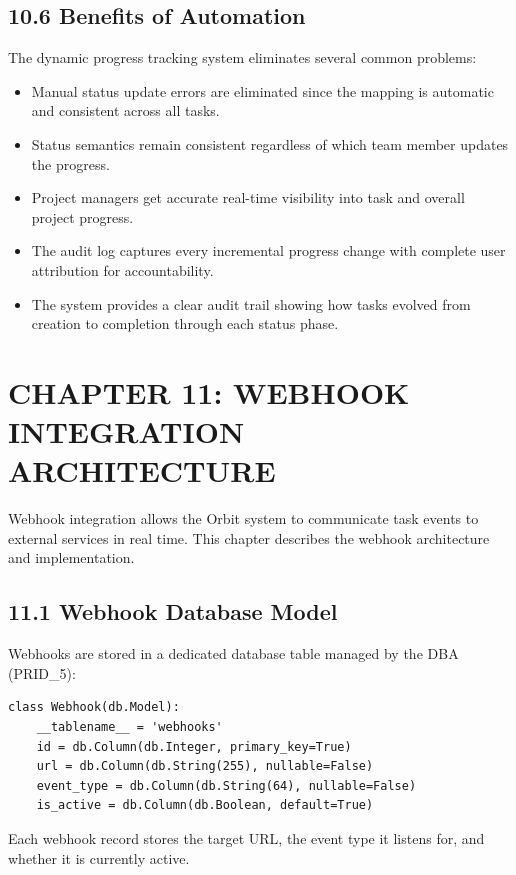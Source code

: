 ﻿\documentclass[12pt]{article}
\def\normaltext{\fontsize{12pt}{18pt}\color{secondary}}
\begin{document}
\subsection*{10.6 Benefits of Automation}
The dynamic progress tracking system eliminates several common problems:
\begin{itemize}
\item Manual status update errors are eliminated since the mapping is automatic and consistent across all tasks.
\item Status semantics remain consistent regardless of which team member updates the progress.
\item Project managers get accurate real-time visibility into task and overall project progress.
\item The audit log captures every incremental progress change with complete user attribution for accountability.
\item The system provides a clear audit trail showing how tasks evolved from creation to completion through each status phase.
\end{itemize}
\newpage

\section*{{\color{primary}CHAPTER 11: WEBHOOK INTEGRATION ARCHITECTURE}}
\normaltext
Webhook integration allows the Orbit system to communicate task events to external services in real time. This chapter describes the webhook architecture and implementation.

\subsection*{11.1 Webhook Database Model}
Webhooks are stored in a dedicated database table managed by the DBA (PRID\_5):

\begin{lstlisting}[style=pycode]
class Webhook(db.Model):
    __tablename__ = 'webhooks'
    id = db.Column(db.Integer, primary_key=True)
    url = db.Column(db.String(255), nullable=False)
    event_type = db.Column(db.String(64), nullable=False)
    is_active = db.Column(db.Boolean, default=True)
\end{lstlisting}

Each webhook record stores the target URL, the event type it listens for, and whether it is currently active.
\end{document}

